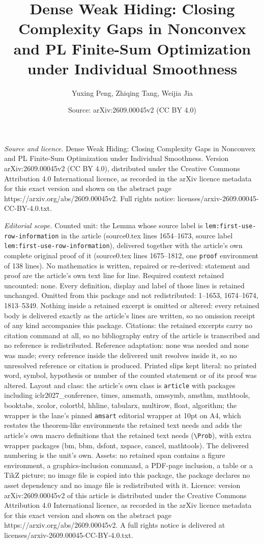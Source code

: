 \documentclass[10pt,a4paper]{amsart}
\title[Dense Weak Hiding: Closing Complexity Gaps in Nonconvex and ]{Dense Weak Hiding: Closing Complexity Gaps in Nonconvex and PL Finite-Sum Optimization under Individual Smoothness}
\author{Yuxing Peng, Zhiqing Tang, Weijia Jia}
\date{Source: arXiv:2609.00045v2 (CC BY 4.0)}
\begin{document}
\maketitle

\noindent\emph{Source and licence.} Dense Weak Hiding: Closing Complexity Gaps in Nonconvex and PL Finite-Sum Optimization under Individual Smoothness. Version arXiv:2609.00045v2 (CC BY 4.0), distributed under the Creative Commons Attribution 4.0 International licence, as recorded in the arXiv licence metadata for this exact version and shown on the abstract page https://arxiv.org/abs/2609.00045v2. Full rights notice: licenses/arxiv-2609.00045-CC-BY-4.0.txt.\par\smallskip

\noindent\textit{Editorial scope.} Counted unit: the Lemma whose source label is \texttt{lem:first-use-row-information} in the article (source0.tex lines 1654--1673, source label \texttt{lem:first-use-row-information}), delivered together with the article's own complete original proof of it (source0.tex lines 1675--1812, one \texttt{proof} environment of 138 lines). No mathematics is written, repaired or re-derived: statement and proof are the article's own text line for line. Required context retained uncounted: none. Every definition, display and label of those lines is retained unchanged. Omitted from this package and not redistributed: 1--1653, 1674--1674, 1813--5349. Nothing inside a retained excerpt is omitted or altered: every retained body is delivered exactly as the article's lines are written, so no omission receipt of any kind accompanies this package. Citations: the retained excerpts carry no citation command at all, so no bibliography entry of the article is transcribed and no reference is redistributed. Reference adaptation: none was needed and none was made; every reference inside the delivered unit resolves inside it, so no unresolved reference or citation is produced. Printed slips kept literal: no printed word, symbol, hypothesis or number of the counted statement or of its proof was altered. Layout and class: the article's own class is \texttt{article} with packages including iclr2027\_conference, times, amsmath, amssymb, amsthm, mathtools, booktabs, xcolor, colortbl, hhline, tabularx, multirow, float, algorithm; the wrapper is the lane's pinned \texttt{amsart} editorial wrapper at 10pt on A4, which restates the theorem-like environments the retained text needs and adds the article's own macro definitions that the retained text needs (\texttt{\textbackslash Prob}), with extra wrapper packages (bm, bbm, dsfont, xspace, cancel, mathtools). The delivered numbering is the unit's own. Assets: no retained span contains a figure environment, a graphics-inclusion command, a PDF-page inclusion, a table or a TikZ picture; no image file is copied into this package, the package declares no asset dependency and no image file is redistributed with it. Licence: version arXiv:2609.00045v2 of this article is distributed under the Creative Commons Attribution 4.0 International licence, as recorded in the arXiv licence metadata for this exact version and shown on the abstract page https://arxiv.org/abs/2609.00045v2. A full rights notice is delivered at licenses/arxiv-2609.00045-CC-BY-4.0.txt. 
\end{document}
